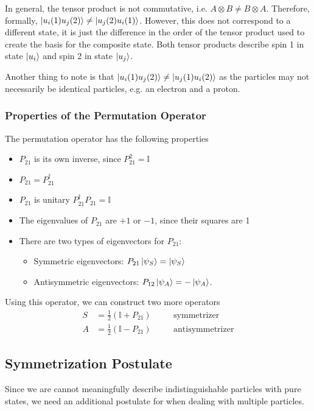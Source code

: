 \documentclass{article}
\begin{document}
In general, the tensor product is not commutative, i.e. $A\otimes B\neq B\otimes A$. Therefore, formally, $\ket{u_i(1)u_j(2)}\neq \ket{u_j(2)u_i(1)}$. However, this does not correspond to a different state, it is just the difference in the order of the tensor product used to create the basis for the composite state. Both tensor products describe spin 1 in state $\ket{u_i}$ and spin 2 in state $\ket{u_j}$.

Another thing to note is that $\ket{u_i(1)u_j(2)}\neq \ket{u_j(1)u_i(2)}$ as the particles may not necessarily be identical particles, e.g. an electron and a proton.

\subsubsection{Properties of the Permutation Operator}
The permutation operator has the following properties
\begin{itemize}
    \item $P_{21}$ is its own inverse, since $P_{21}^2=\mathbb{I}$
    \item $P_{21}=P^\dagger_{21}$
    \item $P_{21}$ is unitary $P^\dagger_{21}P_{21}=\mathbb{I}$
    \item The eigenvalues of $P_{21}$ are $+1$ or $-1$, since their squares are 1
    \item There are two types of eigenvectors for $P_{21}$:
        \begin{itemize}
            \item Symmetric eigenvectors: $P_{21}\ket{\psi _S}=\ket{\psi _S}$\item Antisymmetric eigenvectors: $P_{12}\ket{\psi _A}=-\ket{\psi _A}$.
        \end{itemize}
\end{itemize}
Using this operator, we can construct two more operators
\begin{align*}
    S &= \frac{1}{2}\left( \mathbb{I}+P_{21} \right)&\quad&\text{symmetrizer}\\
    A &= \frac{1}{2}\left( \mathbb{I}-P_{21} \right)&\quad&\text{antisymmetrizer}
\end{align*}

\subsection{Symmetrization Postulate}
Since we are cannot meaningfully describe indistinguishable particles with pure states, we need an additional postulate for when dealing with multiple particles.
\end{document}
